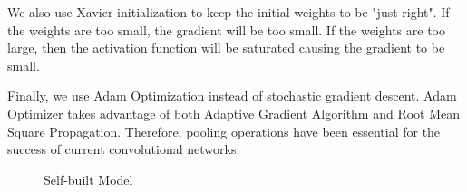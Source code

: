 \documentclass{article} %
\begin{document}
 We also use Xavier initialization to keep the initial weights to be "just right". If the weights are 
 too small, the gradient will be too small. If the weights are too large, then the activation function 
 will be saturated causing the gradient to be small. \
 
 Finally, we use Adam Optimization instead of stochastic gradient descent. Adam Optimizer takes advantage
 of both Adaptive Gradient Algorithm and Root Mean Square Propagation. 
 Therefore, pooling operations have been essential for the success of current convolutional networks.
\begin{figure}[h]
    \centering
    \qquad
    \caption{Self-built Model}
    \label{fig:self}
\end{figure}
\end{document}
